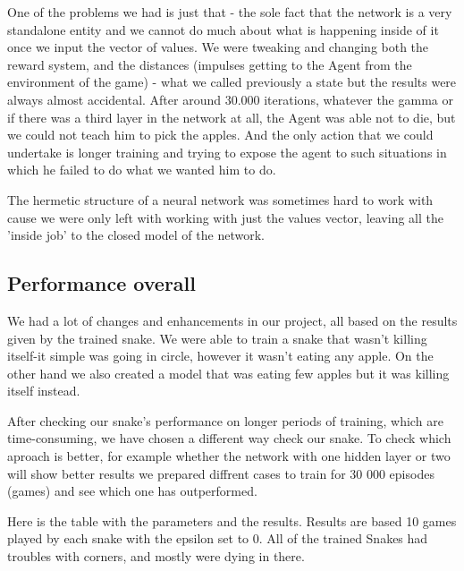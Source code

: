 \documentclass[]{article}
\begin{document}
\par One of the problems we had is just that - the sole fact that the network is a very standalone entity and we cannot do much about what is happening inside of it once we input the vector of values. We were tweaking and changing both the reward system, and the distances (impulses getting to the Agent from the environment of the game) - what we called previously a state but the results were always almost accidental. After around 30.000 iterations, whatever the gamma or if there was a third layer in the network at all, the Agent was able not to die, but we could not teach him to pick the apples. And the only action that we could undertake is longer training and trying to expose the agent to such situations in which he failed to do what we wanted him to do. 

\par The hermetic structure of a neural network was sometimes hard to work with cause we were only left with working with just the values vector, leaving all the 'inside job' to the closed model of the network.

\subsection{Performance overall}

\par We had a lot of changes and enhancements in our project, all based on the results given by the trained snake. We were able to train a snake that wasn't killing itself-it simple was going in circle, however it wasn't eating any apple. On the other hand we also created a model that was eating few apples but it was killing itself instead.

\par After checking our snake's performance on longer periods of training, which are time-consuming, we have chosen a different way check our snake. To check which aproach is better, for example whether the network with one hidden layer or two will show better results we prepared diffrent cases to train for 30 000 episodes (games) and see which one has outperformed.

\par Here is the table with the parameters and the results. Results are based 10 games played by each snake with the epsilon set to 0. All of the trained Snakes had troubles with corners, and mostly were dying in there.
\end{document}
